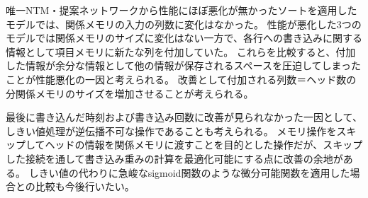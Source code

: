 唯一NTM・提案ネットワークから性能にほぼ悪化が無かったソートを適用したモデルでは、関係メモリの入力の列数に変化はなかった。
性能が悪化した3つのモデルでは関係メモリのサイズに変化はない一方で、各行への書き込みに関する情報として項目メモリに新たな列を付加していた。
これらを比較すると、付加した情報が余分な情報として他の情報が保存されるスペースを圧迫してしまったことが性能悪化の一因と考えられる。
改善として付加される列数＝ヘッド数の分関係メモリのサイズを増加させることが考えられる。

最後に書き込んだ時刻および書き込み回数に改善が見られなかった一因として、しきい値処理が逆伝播不可な操作であることも考えられる。
メモリ操作をスキップしてヘッドの情報を関係メモリに渡すことを目的とした操作だが、スキップした接続を通して書き込み重みの計算を最適化可能にする点に改善の余地がある。
しきい値の代わりに急峻なsigmoid関数のような微分可能関数を適用した場合との比較も今後行いたい。

